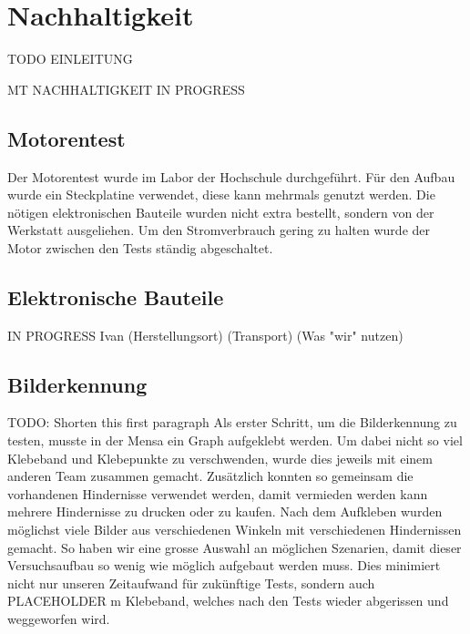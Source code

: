 \section{Nachhaltigkeit}
\label{section:Nachhaltigkeit}

TODO EINLEITUNG 


MT NACHHALTIGKEIT IN PROGRESS


\subsection{Motorentest}

Der Motorentest wurde im Labor der Hochschule durchgeführt. Für den Aufbau wurde ein Steckplatine verwendet, diese kann mehrmals genutzt werden. Die nötigen elektronischen Bauteile wurden nicht extra bestellt, sondern von der Werkstatt ausgeliehen. Um den Stromverbrauch gering zu halten wurde der Motor zwischen den Tests ständig abgeschaltet. 

\subsection{Elektronische Bauteile}

IN PROGRESS
Ivan
(Herstellungsort) 
(Transport)
(Was "wir" nutzen)


\subsection{Bilderkennung}

TODO: Shorten this first paragraph
Als erster Schritt, um die Bilderkennung zu testen, musste in der Mensa ein Graph aufgeklebt werden.
Um dabei nicht so viel Klebeband und Klebepunkte zu verschwenden, wurde dies jeweils mit einem anderen Team zusammen gemacht. Zusätzlich konnten so gemeinsam die vorhandenen Hindernisse verwendet werden, damit vermieden werden kann mehrere Hindernisse zu drucken oder zu kaufen.
Nach dem Aufkleben wurden möglichst viele Bilder aus verschiedenen Winkeln mit verschiedenen Hindernissen gemacht. So haben wir eine grosse Auswahl an möglichen Szenarien, damit dieser Versuchsaufbau so wenig wie möglich aufgebaut werden muss. Dies minimiert nicht nur unseren Zeitaufwand für zukünftige Tests, sondern auch PLACEHOLDER m Klebeband, welches nach den Tests wieder abgerissen und weggeworfen wird.

